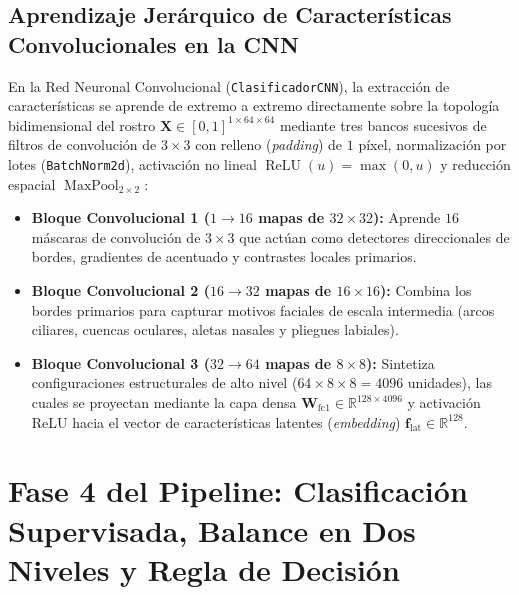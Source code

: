 \documentclass{article}
\begin{document}
\subsection{Aprendizaje Jerárquico de Características Convolucionales en la CNN}
En la Red Neuronal Convolucional (\texttt{ClasificadorCNN}), la extracción de características se aprende de extremo a extremo directamente sobre la topología bidimensional del rostro $\mathbf{X} \in [0,1]^{1 \times 64 \times 64}$ mediante tres bancos sucesivos de filtros de convolución de $3 \times 3$ con relleno (\textit{padding}) de $1$ píxel, normalización por lotes (\texttt{BatchNorm2d}), activación no lineal $\operatorname{ReLU}(u) = \max(0, u)$ y reducción espacial $\operatorname{MaxPool}_{2 \times 2}$:
\begin{itemize}
    \item \textbf{Bloque Convolucional 1 ($1 \to 16$ mapas de $32 \times 32$):} Aprende $16$ máscaras de convolución de $3 \times 3$ que actúan como detectores direccionales de bordes, gradientes de acentuado y contrastes locales primarios.
    \item \textbf{Bloque Convolucional 2 ($16 \to 32$ mapas de $16 \times 16$):} Combina los bordes primarios para capturar motivos faciales de escala intermedia (arcos ciliares, cuencas oculares, aletas nasales y pliegues labiales).
    \item \textbf{Bloque Convolucional 3 ($32 \to 64$ mapas de $8 \times 8$):} Sintetiza configuraciones estructurales de alto nivel ($64 \times 8 \times 8 = 4096$ unidades), las cuales se proyectan mediante la capa densa $\mathbf{W}_{\text{fc1}} \in \mathbb{R}^{128 \times 4096}$ y activación ReLU hacia el vector de características latentes (\textit{embedding}) $\mathbf{f}_{\text{lat}} \in \mathbb{R}^{128}$.
\end{itemize}

\section{Fase 4 del Pipeline: Clasificación Supervisada, Balance en Dos Niveles y Regla de Decisión}
\end{document}
